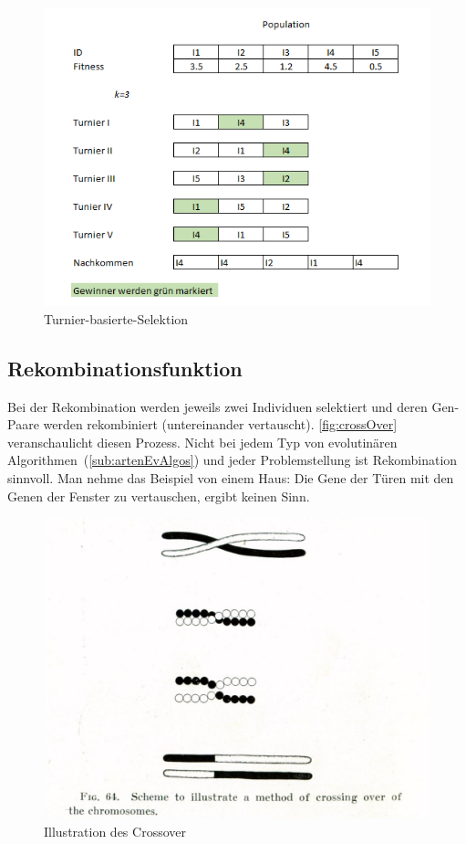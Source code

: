         \begin{figure}[H]
          \includegraphics[scale=1, center]{graphics/tournament_based}
          \caption{Turnier-basierte-Selektion~\label{fig:tournament_based}}
        \end{figure}

    \subsection{Rekombinationsfunktion}

        Bei der Rekombination werden jeweils zwei Individuen selektiert und
        deren Gen-Paare werden rekombiniert (untereinander vertauscht).
        \vref{fig:crossOver} veranschaulicht diesen Prozess.
        Nicht bei jedem Typ von evolutinären Algorithmen~(\vref{sub:artenEvAlgos}) und jeder Problemstellung ist Rekombination sinnvoll.
        Man nehme das Beispiel von einem Haus: Die Gene der Türen mit den Genen der Fenster zu vertauschen, ergibt keinen Sinn.


        \begin{figure}[H]
          \includegraphics[scale=0.3, center]{graphics/morgan_crossover}
          \caption[\protect{}]{Illustration des Crossover~\label{fig:crossOver}}
        \end{figure}

